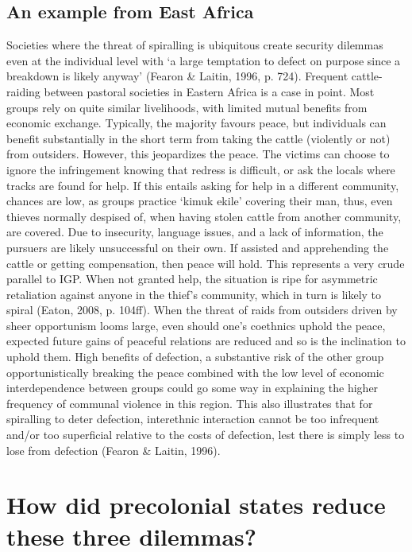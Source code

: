 \documentclass[12pt]{article}
\begin{document}
\subsection{An example from East Africa}

Societies where the threat of spiralling is ubiquitous create security dilemmas
even at the individual level with ‘a large temptation to defect on purpose since
a breakdown is likely anyway’ (Fearon \& Laitin, 1996, p. 724). Frequent
cattle-raiding between pastoral societies in Eastern Africa is a case in point.
Most groups rely on quite similar livelihoods, with limited mutual benefits from
economic exchange. Typically, the majority favours peace, but individuals can
benefit substantially in the short term from taking the cattle (violently or
not) from outsiders. However, this jeopardizes the peace. The victims can choose
to ignore the infringement knowing that redress is difficult, or ask the locals
where tracks are found for help. If this entails asking for help in a different
community, chances are low, as groups practice ‘kimuk ekile’ covering their man,
thus, even thieves normally despised of, when having stolen cattle from another
community, are covered. Due to insecurity, language issues, and a lack of
information, the pursuers are likely unsuccessful on their own. If assisted and
apprehending the cattle or getting compensation, then peace will hold. This
represents a very crude parallel to IGP. When not granted help, the situation is
ripe for asymmetric retaliation against anyone in the thief’s community, which
in turn is likely to spiral (Eaton, 2008, p. 104ff). When the threat of raids
from outsiders driven by sheer opportunism looms large, even should one’s
coethnics uphold the peace, expected future gains of peaceful relations are
reduced and so is the inclination to uphold them. High benefits of defection, a
substantive risk of the other group opportunistically breaking the peace
combined with the low level of economic interdependence between groups could go
some way in explaining the higher frequency of communal violence in this region.
This also illustrates that for spiralling to deter defection, interethnic
interaction cannot be too infrequent and/or too superficial relative to the
costs of defection, lest there is simply less to lose from defection (Fearon \&
Laitin, 1996). 


\section{How did precolonial states reduce these three dilemmas?}
\end{document}
